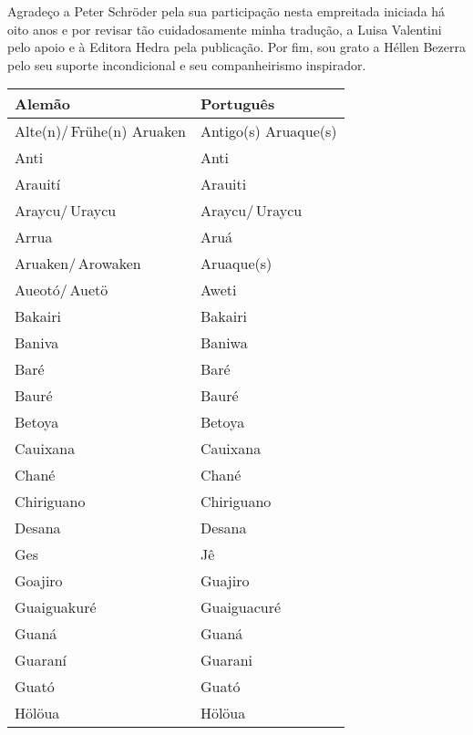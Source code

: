 Agradeço a Peter Schröder pela sua participação nesta empreitada
iniciada há oito anos e por revisar tão cuidadosamente minha tradução, a
Luisa Valentini pelo apoio e à Editora Hedra pela publicação. Por fim,
sou grato a Héllen Bezerra pelo seu suporte incondicional e seu
companheirismo inspirador.

\small
\begin{center}
\begin{tabular}{ | m{12em} | m{4.2cm}| } 
\hline
\textbf{Alemão} & \textbf{Português} \\ [0.5ex] 
\hline\hline
Alte(n)/\,Frühe(n) Aruaken & Antigo(s) Aruaque(s) \\
\hline
Anti 						& Anti \\
\hline
Arauití 					& Arauiti \\
\hline
Araycu/\,Uraycu              & Araycu/\,Uraycu  \\
\hline
Arrua           	  	       	  & Aruá \\
\hline
Aruaken/\,Arowaken 	       	  & Aruaque(s) \\
\hline
Aueotó/\,Auetö    	       	  & Aweti \\
\hline
Bakairi           	       	  & Bakairi \\
\hline
Baniva            	       	  & Baniwa \\
\hline
Baré              	       	  & Baré \\
\hline
Bauré             	       	  & Bauré \\
\hline
Betoya            	       	  & Betoya \\
\hline
Cauixana          	       	  & Cauixana \\
\hline
Chané             	       	  & Chané \\
\hline
Chiriguano        	       	  & Chiriguano \\
\hline
Desana            	       	  & Desana \\
\hline
Ges               	       	  & Jê \\
\hline
Goajiro           	       	  & Guajiro \\
\hline
Guaiguakuré       	       	  & Guaiguacuré \\
\hline
Guaná             	       	  & Guaná \\
\hline
Guaraní           	       	  & Guarani \\
\hline
Guató             	       	  & Guató \\
\hline
Hölöua            	       	  & Hölöua \\

\end{tabular}
\end{center}
